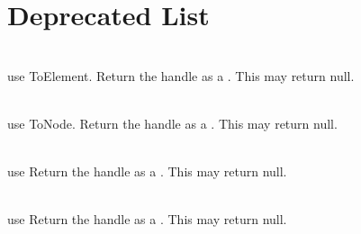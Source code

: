 \chapter{Deprecated List}
\hypertarget{deprecated}{}\label{deprecated}

\begin{DoxyRefList}
\item[Member \doxylink{class_ti_xml_handle_ac56814c76757eecc5bd951d3ed710dd2}{Ti\+Xml\+Handle\+::Element} () const]\hfill \\
\label{deprecated__deprecated000002}%
%
use To\+Element. Return the handle as a . This may return null.  
\item[Member \doxylink{class_ti_xml_handle_afa2eb82bacfb6e4c3dd5351ce28e5d7a}{Ti\+Xml\+Handle\+::Node} () const]\hfill \\
\label{deprecated__deprecated000001}%
%
use To\+Node. Return the handle as a . This may return null.  
\item[Member \doxylink{class_ti_xml_handle_a58a9b3e3d710a603038e6e291eb6d580}{Ti\+Xml\+Handle\+::Text} () const]\hfill \\
\label{deprecated__deprecated000003}%
%
use  Return the handle as a . This may return null.  
\item[Member \doxylink{class_ti_xml_handle_aa7a8756af3ac24f0b2d469e500b85824}{Ti\+Xml\+Handle\+::Unknown} () const]\hfill \\
\label{deprecated__deprecated000004}%
%
use  Return the handle as a . This may return null. 
\end{DoxyRefList}